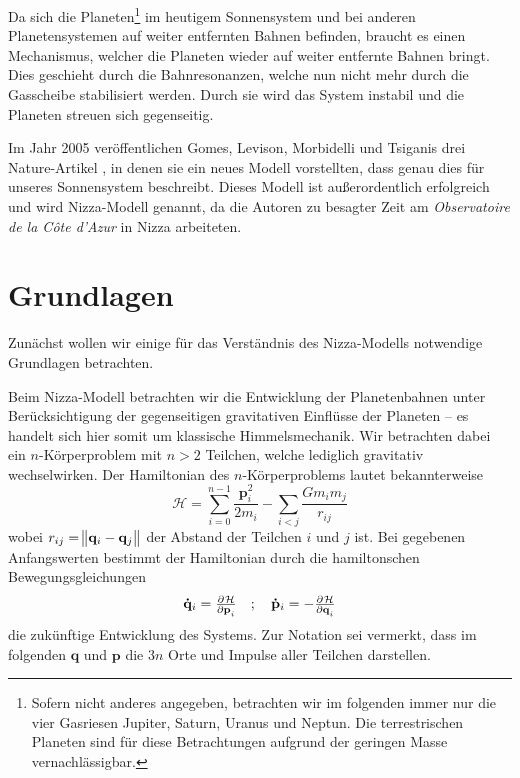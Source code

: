 \documentclass[12pt,a4paper,twoside,open=right,bibliography=totoc]{scrbook}
\renewcommand{\cite}{ \citep}
\renewcommand{\vec}{\mathbf}
\begin{document}
Da sich die Planeten\footnote{Sofern nicht anderes angegeben, betrachten wir im folgenden immer nur die vier Gasriesen Jupiter, Saturn, Uranus und Neptun. Die terrestrischen Planeten sind für diese Betrachtungen aufgrund der geringen Masse vernachlässigbar.} im heutigem Sonnensystem und bei anderen Planetensystemen auf weiter entfernten Bahnen befinden, braucht es einen Mechanismus, welcher die Planeten wieder auf weiter entfernte Bahnen bringt.
Dies geschieht durch die Bahnresonanzen, welche nun nicht mehr durch die Gasscheibe stabilisiert werden.
Durch sie wird das System instabil und die Planeten streuen sich gegenseitig.

Im Jahr 2005 veröffentlichen Gomes, Levison, Morbidelli und Tsiganis drei Nature-Artikel\cite{Tsiganis2005,Morbidelli2005,Gomes2005},
in denen sie ein neues Modell vorstellten, dass genau dies für unseres Sonnensystem beschreibt.
Dieses Modell ist außerordentlich erfolgreich und wird Nizza-Modell genannt, da die Autoren zu besagter Zeit am \emph{Observatoire de la Côte d’Azur} in Nizza arbeiteten.

\FloatBarrier
\chapter{Grundlagen}
Zunächst wollen wir einige für das Verständnis des Nizza-Modells notwendige Grundlagen betrachten.

Beim Nizza-Modell betrachten wir die Entwicklung der Planetenbahnen unter Be\-rück\-sich\-ti\-gung der gegenseitigen gravitativen Einflüsse der Planeten -- es handelt sich hier somit um klassische Himmelsmechanik.
Wir betrachten dabei ein $n$-Körperproblem mit $n>2$ Teilchen, welche lediglich gravitativ wechselwirken.
Der Hamiltonian des $n$-Körperproblems lautet bekannterweise
\begin{equation}\label{eq:nbodyhamilton}
{\mathcal H} = \sum\limits_{i=0}^{n-1} \frac{\vec p_i^2}{2m_i} - \sum\limits_{i<j} \frac{Gm_im_j}{r_{ij}}
\end{equation}
wobei $r_{ij}=\norm{\vec q_i-\vec q_j}$ der Abstand der Teilchen $i$ und $j$ ist.
Bei gegebenen Anfangswerten bestimmt der Hamiltonian durch die hamiltonschen Bewegungsgleichungen
\begin{equation}
\vec{\dot{q}}_i = \pd{\mathcal H}{\vec p_i} \quad ; \quad \vec{\dot{p}}_i = - \pd{\mathcal H}{\vec q_i}
\end{equation}
die zukünftige Entwicklung des Systems. Zur Notation sei vermerkt, dass im folgenden $\vec q$ und $\vec p$ die $3n$ Orte und Impulse aller Teilchen darstellen.
\end{document}
